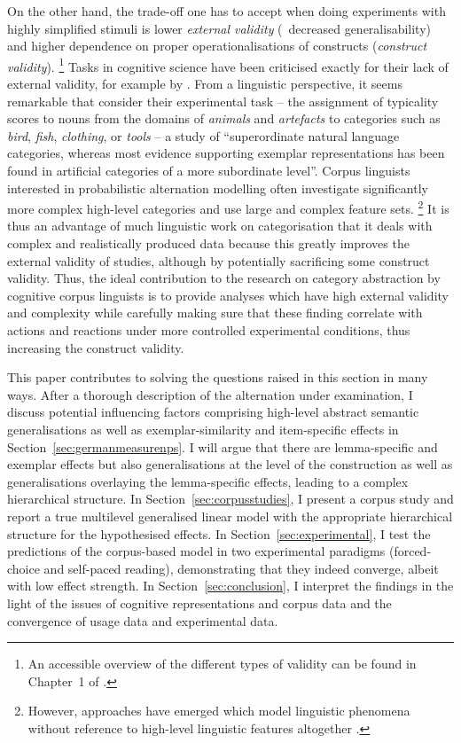On the other hand, the trade-off one has to accept when doing experiments with highly simplified stimuli is lower \textit{external validity} (\ie\ decreased generalisability) and higher dependence on proper operationalisations of constructs (\textit{construct validity}).%
\footnote{An accessible overview of the different types of validity can be found in Chapter~1 of \citet{MaxwellDelaney2004}.}
Tasks in cognitive science have been criticised exactly for their lack of external validity, for example by \citet{Murphy2003}.
From a linguistic perspective, it seems remarkable that \citet[1013]{VoorspoelsEa2011} consider their experimental task -- the assignment of typicality scores to nouns from the domains of \textit{animals} and \textit{artefacts} to categories such as \textit{bird}, \textit{fish}, \textit{clothing}, or \textit{tools} -- a study of ``superordinate natural language categories, whereas most evidence supporting exemplar representations has been found in artificial categories of a more subordinate level''.
Corpus linguists interested in probabilistic alternation modelling often investigate significantly more complex high-level categories and use large and complex feature sets.%
\footnote{However, approaches have emerged which model linguistic phenomena without reference to high-level linguistic features altogether \citep{BaayenEa2016,RamscarPort2016}.}
It is thus an advantage of much linguistic work on categorisation that it deals with complex and realistically produced data because this greatly improves the external validity of studies, although by potentially sacrificing some construct validity.
Thus, the ideal contribution to the research on category abstraction by cognitive corpus linguists is to provide analyses which have high external validity and complexity while carefully making sure that these finding correlate with actions and reactions under more controlled experimental conditions, thus increasing the construct validity.

This paper contributes to solving the questions raised in this section in many ways.
After a thorough description of the alternation under examination, I discuss potential influencing factors comprising high-level abstract semantic generalisations as well as exemplar-similarity and item-specific effects in Section~\ref{sec:germanmeasurenps}.
I will argue that there are lemma-specific and exemplar effects but also generalisations at the level of the construction as well as generalisations overlaying the lemma-specific effects, leading to a complex hierarchical structure.
In Section~\ref{sec:corpusstudies}, I present a corpus study and report a true multilevel generalised linear model with the appropriate hierarchical structure for the hypothesised effects.
In Section~\ref{sec:experimental}, I test the predictions of the corpus-based model in two experimental paradigms (forced-choice and self-paced reading), demonstrating that they indeed converge, albeit with low effect strength.
In Section~\ref{sec:conclusion}, I interpret the findings in the light of the issues of cognitive representations and corpus data and the convergence of usage data and experimental data.

